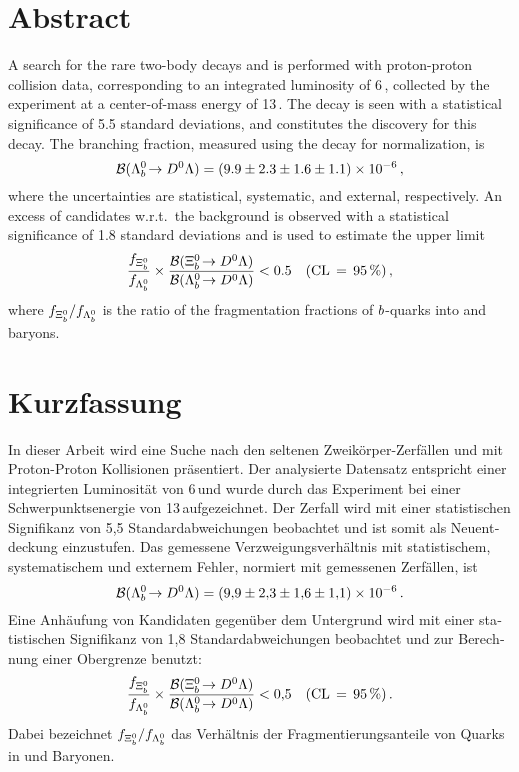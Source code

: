 \section*{Abstract}
A search for the rare two-body decays \decay{\Lb}{\Dz\Lz} and \decay{\Xibz}{\Dz\Lz} is performed with proton-proton collision data, corresponding to an integrated luminosity of 6\,\invfb, collected by the \lhcb experiment at a center-of-mass energy of 13\,\tev.
The decay \decay{\Lb}{\Dz\Lz} is seen with a statistical significance of 5.5 standard deviations, and constitutes the discovery for this decay.
The branching fraction, measured using the \decay{\Lb}{\Dz\proton\pim} decay for normalization, is
\begin{equation*}
    {\ensuremath{\mathcal{B}}}({{\Lambda}^0_{b}}\!\rightarrow {\ensuremath{{D}^0}}{\ensuremath{\Lambda}}) = (9.9 \pm 2.3 \pm 1.6 \pm 1.1) \times 10^{-6} \,,
\end{equation*}
where the uncertainties are statistical, systematic, and external, respectively.
An excess of \decay{\Xibz}{\Dz\Lz} candidates w.r.t.\ the background is observed with a statistical significance of 1.8 standard deviations and is used to estimate the upper limit
\begin{equation*}
    \frac{f_{{{\Xi}^0_{b}}}}{f_{{{\Lambda}^0_{b}}}} \times \frac{{\mathcal{B}}({{\Xi}^0_{b}}\!\rightarrow {\ensuremath{{D}^0}}{\ensuremath{\Lambda}})}{{\mathcal{B}}({{\Lambda}^0_{b}}\!\rightarrow {\ensuremath{{D}^0}}{\ensuremath{\Lambda}})} < 0.5 \quad (\text{CL}\,=\,95\,\%) \,,
\end{equation*}
where $f_{{{\Xi}^0_{b}}} / f_{{{\Lambda}^0_{b}}}$ is the ratio of the fragmentation fractions of ${b}$-quarks into \Xibz and \Lb baryons.

\vfill

\section*{Kurzfassung}
\begin{otherlanguage}{ngerman}
In dieser Arbeit wird eine Suche nach den seltenen Zweikörper-Zerfällen \decay{\Lb}{\Dz\Lz} und \decay{\Xibz}{\Dz\Lz} mit Proton-Proton Kollisionen präsentiert.
Der analysierte Datensatz entspricht einer integrierten Luminosität von 6\,\invfb und wurde durch das \lhcb Experiment bei einer Schwerpunktsenergie von 13\,\tev aufgezeichnet.
Der Zerfall \decay{\Lb}{\Dz\Lz} wird mit einer statistischen Signifikanz von 5,5 Standardabweichungen beobachtet und ist somit als Neuentdeckung einzustufen.
Das gemessene Verzweigungsverhältnis mit statistischem, systematischem und externem Fehler, normiert mit gemessenen \decay{\Lb}{\Dz\proton\pim} Zerfällen, ist
\begin{equation*}
    {\ensuremath{\mathcal{B}}}({{\Lambda}^0_{b}}\!\rightarrow {\ensuremath{{D}^0}}{\ensuremath{\Lambda}}) = (9,\!9 \pm 2,\!3 \pm 1,\!6 \pm 1,\!1) \times 10^{-6} \,.
\end{equation*}
Eine Anhäufung von \decay{\Xibz}{\Dz\Lz} Kandidaten gegenüber dem Untergrund wird mit einer statistischen Signifikanz von 1,8 Standardabweichungen beobachtet und zur Berechnung einer Obergrenze benutzt:
\begin{equation*}
    \frac{f_{{{\Xi}^0_{b}}}}{f_{{{\Lambda}^0_{b}}}} \times \frac{{\mathcal{B}}({{\Xi}^0_{b}}\!\rightarrow {\ensuremath{{D}^0}}{\ensuremath{\Lambda}})}{{\mathcal{B}}({{\Lambda}^0_{b}}\!\rightarrow {\ensuremath{{D}^0}}{\ensuremath{\Lambda}})} < 0,\!5 \quad (\text{CL}\,=\,95\,\%) \,.
\end{equation*}
Dabei bezeichnet $f_{{{\Xi}^0_{b}}} / f_{{{\Lambda}^0_{b}}}$ das Verhältnis der Fragmentierungsanteile von \bquark Quarks in \Xibz und \Lb Baryonen.
\end{otherlanguage}
